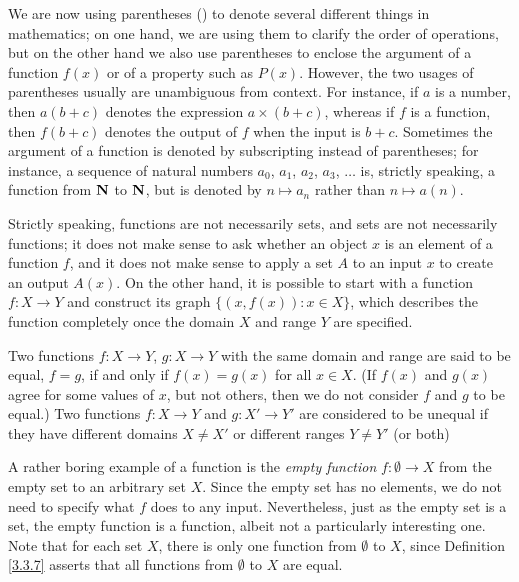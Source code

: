 \setcounter{theorem}{4}
\begin{remark}\label{3.3.5}
    We are now using parentheses () to denote several different things in mathematics;
    on one hand, we are using them to clarify the order of operations, but on the other hand we also use parentheses to enclose the argument of a function \(f(x)\) or of a property such as \(P(x)\).
    However, the two usages of parentheses usually are unambiguous from context.
    For instance, if \(a\) is a number, then \(a(b + c)\) denotes the expression \(a \times (b + c)\), whereas if \(f\) is a function, then \(f(b + c)\) denotes the output of \(f\) when the input is \(b + c\).
    Sometimes the argument of a function is denoted by subscripting instead of parentheses;
    for instance, a sequence of natural numbers \(a_0\), \(a_1\), \(a_2\), \(a_3\), \(\dots\) is, strictly speaking, a function from \(\mathbf{N}\) to \(\mathbf{N}\), but is denoted by \(n \mapsto a_n\) rather than \(n \mapsto a(n)\).
\end{remark}

\begin{remark}\label{3.3.6}
    Strictly speaking, functions are not necessarily sets, and sets are not necessarily functions;
    it does not make sense to ask whether an object \(x\) is an element of a function \(f\), and it does not make sense to apply a set \(A\) to an input \(x\) to create an output \(A(x)\).
    On the other hand, it is possible to start with a function \(f : X \to Y\) and construct its graph \(\{(x, f(x)) : x \in X\}\), which describes the function completely once the domain \(X\) and range \(Y\) are specified.
\end{remark}

\begin{definition}\label{3.3.7}
    Two functions \(f : X \to Y\), \(g : X \to Y\) with the same domain and range are said to be equal, \(f = g\), if and only if \(f(x) = g(x)\) for all \(x \in X\).
    (If \(f(x)\) and \(g(x)\) agree for some values of \(x\), but not others, then we do not consider \(f\) and \(g\) to be equal.)
    Two functions \(f : X \to Y\) and \(g : X' \to Y'\) are considered to be unequal if they have different domains \(X \neq X'\) or different ranges \(Y \neq Y'\) (or both)
\end{definition}

\begin{note}
    A rather boring example of a function is the \emph{empty function} \(f : \emptyset \to X\) from the empty set to an arbitrary set \(X\).
    Since the empty set has no elements, we do not need to specify what \(f\) does to any input.
    Nevertheless, just as the empty set is a set, the empty function is a function, albeit not a particularly interesting one.
    Note that for each set \(X\), there is only one function from \(\emptyset\) to \(X\), since Definition \ref{3.3.7} asserts that all functions from \(\emptyset\) to \(X\) are equal.
\end{note}

